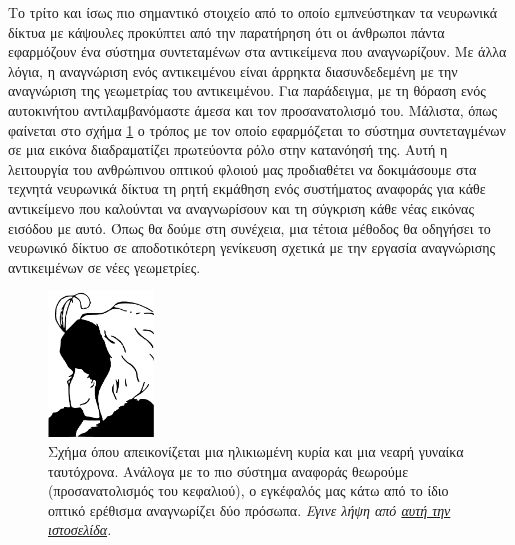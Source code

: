 Το τρίτο και ίσως πιο σημαντικό στοιχείο από το οποίο εμπνεύστηκαν τα νευρωνικά δίκτυα με κάψουλες προκύπτει από την παρατήρηση ότι οι άνθρωποι πάντα εφαρμόζουν ένα σύστημα συντεταμένων στα αντικείμενα που αναγνωρίζουν. Με άλλα λόγια, η αναγνώριση ενός αντικειμένου είναι άρρηκτα διασυνδεδεμένη με την αναγνώριση της γεωμετρίας του αντικειμένου. Για παράδειγμα, με τη θόραση ενός αυτοκινήτου αντιλαμβανόμαστε άμεσα και τον προσανατολισμό του. Μάλιστα, όπως φαίνεται στο σχήμα \ref{fig:my_wife} ο τρόπος με τον οποίο εφαρμόζεται το σύστημα συντεταγμένων σε μια εικόνα διαδραματίζει πρωτεύοντα ρόλο στην κατανόησή της. Αυτή η λειτουργία του ανθρώπινου οπτικού φλοιού μας προδιαθέτει να δοκιμάσουμε στα τεχνητά νευρωνικά δίκτυα τη ρητή εκμάθηση ενός συστήματος αναφοράς για κάθε αντικείμενο που καλούνται να αναγνωρίσουν και τη σύγκριση κάθε νέας εικόνας εισόδου με αυτό. Όπως θα δούμε στη συνέχεια, μια τέτοια μέθοδος θα οδηγήσει το νευρωνικό δίκτυο σε αποδοτικότερη γενίκευση σχετικά με την εργασία αναγνώρισης αντικειμένων σε νέες γεωμετρίες.

\begin{figure}[h]
  \centering
  \includegraphics[width=0.25\textwidth]{images/chapter theoritical background/My_wife_and_my_mother_in_law.pdf}
  \caption{Σχήμα όπου απεικονίζεται μια ηλικιωμένη κυρία και μια νεαρή γυναίκα ταυτόχρονα. Ανάλογα με το πιο σύστημα αναφοράς θεωρούμε (προσανατολισμός του κεφαλιού), ο εγκέφαλός μας κάτω από το ίδιο οπτικό ερέθισμα αναγνωρίζει δύο πρόσωπα. \textit{Εγινε λήψη από \href{https://commons.wikimedia.org/wiki/File:My_Wife_and_My_Mother-In-Law_(Hill).svg}{αυτή την ιστοσελίδα}.}} 
  \label{fig:my_wife}
\end{figure} 

